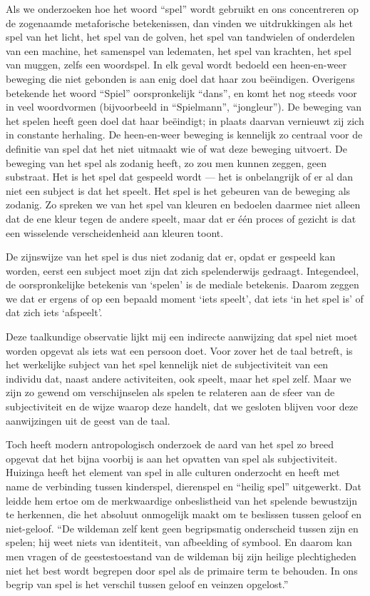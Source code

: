 Als we onderzoeken hoe het woord ``spel'' wordt gebruikt en ons concentreren op de zogenaamde metaforische betekenissen, dan vinden we uitdrukkingen als het spel van het licht, het spel van de golven, het spel van tandwielen of onderdelen van een machine, het samenspel van ledematen, het spel van krachten, het spel van muggen, zelfs een woordspel. In elk geval wordt bedoeld een heen-en-weer beweging die niet gebonden is aan enig doel dat haar zou beëindigen. Overigens betekende het woord ``Spiel'' oorspronkelijk ``dans'', en komt het nog steeds voor in veel woordvormen (bijvoorbeeld in ``Spielmann'', ``jongleur''). De beweging van het spelen heeft geen doel dat haar beëindigt; in plaats daarvan vernieuwt zij zich in constante herhaling. De heen-en-weer beweging is kennelijk zo centraal voor de definitie van spel dat het niet uitmaakt wie of wat deze beweging uitvoert. De beweging van het spel als zodanig heeft, zo zou men kunnen zeggen, geen substraat. Het is het spel dat gespeeld wordt — het is onbelangrijk of er al dan niet een subject is dat het speelt. Het spel is het gebeuren van de beweging als zodanig. Zo spreken we van het spel van kleuren en bedoelen daarmee niet alleen dat de ene kleur tegen de andere speelt, maar dat er één proces of gezicht is dat een wisselende verscheidenheid aan kleuren toont.

De zijnswijze van het spel is dus niet zodanig dat er, opdat er gespeeld kan worden, eerst een subject moet zijn dat zich spelenderwijs gedraagt. Integendeel, de oorspronkelijke betekenis van ‘spelen’ is de mediale betekenis. Daarom zeggen we dat er ergens of op een bepaald moment ‘iets speelt’, dat iets ‘in het spel is’ of dat zich iets ‘afspeelt’.

Deze taalkundige observatie lijkt mij een indirecte aanwijzing dat spel niet moet worden opgevat als iets wat een persoon doet. Voor zover het de taal betreft, is het werkelijke subject van het spel kennelijk niet de subjectiviteit van een individu dat, naast andere activiteiten, ook speelt, maar het spel zelf. Maar we zijn zo gewend om verschijnselen als spelen te relateren aan de sfeer van de subjectiviteit en de wijze waarop deze handelt, dat we gesloten blijven voor deze aanwijzingen uit de geest van de taal.

Toch heeft modern antropologisch onderzoek de aard van het spel zo breed opgevat dat het bijna voorbij is aan het opvatten van spel als subjectiviteit. Huizinga heeft het element van spel in alle culturen onderzocht en heeft met name de verbinding tussen kinderspel, dierenspel en ``heilig spel'' uitgewerkt. Dat leidde hem ertoe om de merkwaardige onbeslistheid van het spelende bewustzijn te herkennen, die het absoluut onmogelijk maakt om te beslissen tussen geloof en niet-geloof. ``De wildeman zelf kent geen begripsmatig onderscheid tussen zijn en spelen; hij weet niets van identiteit, van afbeelding of symbool. En daarom kan men vragen of de geestestoestand van de wildeman bij zijn heilige plechtigheden niet het best wordt begrepen door spel als de primaire term te behouden. In ons begrip van spel is het verschil tussen geloof en veinzen opgelost.''

